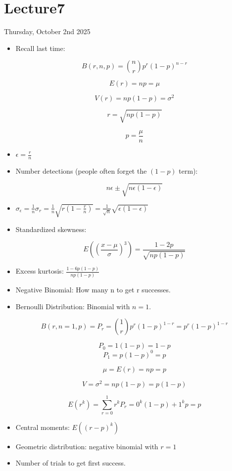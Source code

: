 \section{Lecture7}

Thursday, October 2nd 2025

\begin{itemize}
    \item Recall last time:

          \[ B(r, n, p) = \binom{n}{r} p^r (1-p)^{n-r} \]

          \[ E(r) = np = \mu\]

          \[ V(r) = np(1-p) = \sigma^2 \]

          \[ r = \sqrt{np(1-p)} \]

          \[ p = \frac{\mu}{n} \]

    \item $\epsilon = \frac{r}{n}$
    \item Number detections  (people often forget the $(1-p)$ term):

          \[ n \epsilon \pm \sqrt{n \epsilon (1-\epsilon)} \]

    \item $\sigma_{\epsilon} = \frac{1}{n} \sigma_r = \frac{1}{n} \sqrt{r (1-\frac{r}{n})} = \frac{1}{\sqrt{n}} \sqrt{\epsilon (1-\epsilon)}$
    \item Standardized skewness:

          \[ E \left( \left( \frac{x-\mu}{\sigma} \right)^3 \right) = \frac{1-2p}{\sqrt{np(1-p)}} \]

    \item Excess kurtosis: $\frac{1-6p(1-p)}{np(1-p)}$
    \item Negative Binomial: How many n to get r successes.
    \item Bernoulli Distribution: Binomial with $n=1$.

          \[ B(r, n=1, p) = P_r = \binom{1}{r} p^r (1-p)^{1-r} = p^r (1-p)^{1-r} \]

          \[ P_0 = 1(1-p) = 1-p \]
          \[ P_1 = p(1-p)^0 = p \]

          \[ \mu  = E(r) = n p = p \]

          \[ V = \sigma^2 = np(1-p) = p(1-p) \]

          \[ E(r^k) = \sum_{r=0}^{1} r^k P_r = 0^k (1-p) + 1^k p = p \]

    \item Central moments: $E((r-p)^k)$

    \item Geometric distribution: negative binomial with $r=1$
    \item Number of trials to get first success.


\end{itemize}
